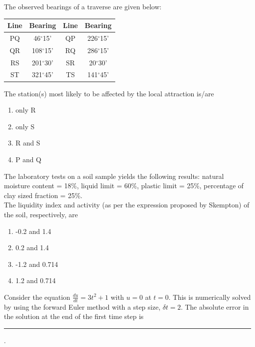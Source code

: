 \item The observed bearings of a traverse are given below:
\begin{table}[H]
    \centering
    \begin{tabular}{|c|c|@{\hskip 10pt}|c|c|}
        \hline
        \textbf{Line} & \textbf{Bearing} & \textbf{Line} & \textbf{Bearing} \\
        \hline
        PQ & 46$^\circ$15' & QP & 226$^\circ$15' \\
        \hline
        QR & 108$^\circ$15' & RQ & 286$^\circ$15' \\
        \hline
        RS & 201$^\circ$30' & SR & 20$^\circ$30' \\
        \hline
        ST & 321$^\circ$45' & TS & 141$^\circ$45' \\
        \hline
    \end{tabular}
\end{table}


The station(s) most likely to be affected by the local attraction is/are
\begin{multicols}{2}
    \begin{enumerate}
        \item only R
        \item only S
        \item R and S
        \item P and Q
    \end{enumerate}
\end{multicols}

\item The laboratory tests on a soil sample yields the following results: natural moisture content = 18\%, liquid limit = 60\%, plastic limit = 25\%, percentage of clay sized fraction = 25\%.\\
The liquidity index and activity (as per the expression proposed by Skempton) of the soil, respectively, are
\begin{multicols}{2}
    \begin{enumerate}
        \item -0.2 and 1.4
        \item 0.2 and 1.4
        \item -1.2 and 0.714
        \item 1.2 and 0.714
    \end{enumerate}
\end{multicols}

\item Consider the equation $\frac{du}{dt} = 3t^2 + 1$ with $u=0$ at $t=0$. This is numerically solved by using the forward Euler method with a step size, $\delta t = 2$. The absolute error in the solution at the end of the first time step is \rule{1cm}{0.15mm} .

